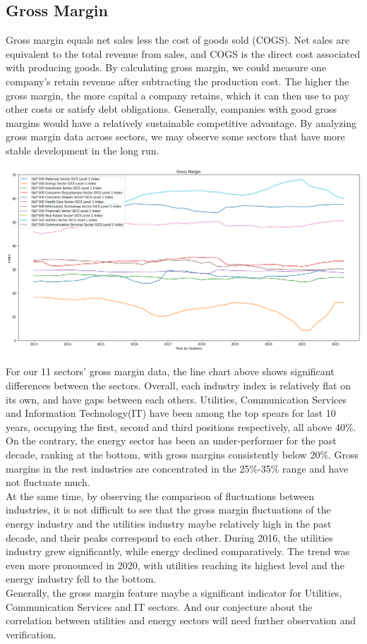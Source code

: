 \documentclass{article}
\begin{document}
\subsection{Gross Margin}
Gross margin equals net sales less the cost of goods sold (COGS). Net sales are equivalent to the total revenue from sales, and COGS is the direct cost associated with producing goods. By calculating gross margin, we could measure one company's retain revenue after subtracting the production cost. The higher the gross margin, the more capital a company retains, which it can then use to pay other costs or satisfy debt obligations. Generally, companies with good gross margins would have a relatively sustainable competitive advantage. By analyzing gross margin data across sectors, we may observe some sectors that have more stable development in the long run.
\begin{center}
    \includegraphics[scale=0.4]{gross_margin.png}
\end{center}
For our 11 sectors’ gross margin data, the line chart above shows significant differences between the sectors. Overall, each industry index is relatively flat on its own, and have gaps between each others. Utilities, Communication Services and Information Technology(IT) have been among the top spears for last 10 years, occupying the first, second and third positions respectively, all above 40$\%$. On the contrary, the energy sector has been an under-performer for the past decade, ranking at the bottom, with gross margins consistently below 20$\%$. Gross margins in the rest industries are concentrated in the 25$\%$-35$\%$ range and have not fluctuate much.\\
At the same time, by observing the comparison of fluctuations between industries, it is not difficult to see that the gross margin fluctuations of the energy industry and the utilities industry maybe relatively high in the past decade, and their peaks correspond to each other. During 2016, the utilities industry grew significantly, while energy declined comparatively. The trend was even more pronounced in 2020, with utilities reaching its highest level and the energy industry fell to the bottom.\\
Generally, the gross margin feature maybe a significant indicator for Utilities, Communication Services and IT sectors. And our conjecture about the correlation between utilities and energy sectors will need further observation and verification.
\end{document}
